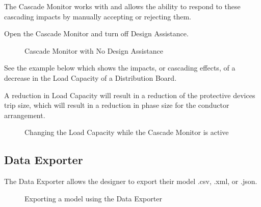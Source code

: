 \documentclass[letterpaper,10pt,english]{sphinxmanual}
\begin{document}
The Cascade Monitor works with {\hyperref[\detokenize{docs/userguide/explorersandutilitytools/statusbar/index-status_bar:design-assistance}]{}} and allows the ability to respond to these cascading impacts by manually accepting or rejecting them.

Open the Cascade Monitor and turn off Design Assistance.

\begin{figure}[H]
\centering
\capstart

\noindent{}
\caption{Cascade Monitor with No Design Assistance}\label{\detokenize{docs/userguide/explorersandutilitytools/cascademonitor/index-cascade_monitor:id2}}\end{figure}

See the example below which shows the impacts, or cascading effects, of a decrease in the Load Capacity of a Distribution Board.

A reduction in Load Capacity will result in a reduction of the protective devices trip size, which will result in a reduction in phase size for the conductor arrangement.

\begin{figure}[H]
\centering
\capstart

\noindent{}
\caption{Changing the Load Capacity while the Cascade Monitor is active}\label{\detokenize{docs/userguide/explorersandutilitytools/cascademonitor/index-cascade_monitor:id3}}\end{figure}


\subsection{Data Exporter}
\label{\detokenize{docs/userguide/explorersandutilitytools/dataexporter/index-data_exporter:data-exporter}}\label{\detokenize{docs/userguide/explorersandutilitytools/dataexporter/index-data_exporter:id1}}\label{\detokenize{docs/userguide/explorersandutilitytools/dataexporter/index-data_exporter::doc}}
The Data Exporter allows the designer to export their model .csv, .xml, or .json.

\begin{figure}[H]
\centering
\capstart

\noindent{}
\caption{Exporting a model using the Data Exporter}\label{\detokenize{docs/userguide/explorersandutilitytools/dataexporter/index-data_exporter:id2}}\end{figure}
\end{document}
